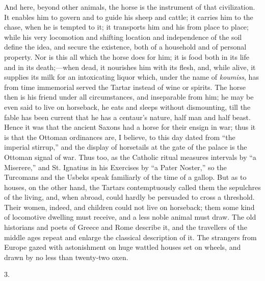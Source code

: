 And here, beyond other
animals, the horse is the instrument of that civilization. It enables
him to govern and to guide his sheep and cattle; it carries him to the
chase, when he is tempted to it; it transports him and his from place
to place; while his very locomotion and shifting location and
independence of the soil define the idea, and secure the existence,
both of a household and of personal property. Nor is this all which
the horse does for him; it is food both in its life and in its
death;—when dead, it nourishes him with its flesh, and, while alive,
it supplies its milk for an intoxicating liquor which, under the name
of \emph{koumiss}, has from time immemorial served the Tartar instead
of wine or spirits. The horse then is his friend under all
circumstances, and inseparable from him; he may be even said to live
on horseback, he eats and sleeps without dismounting, till the fable
has been current that he has a centaur's nature, half man and half
beast. Hence it was that the ancient Saxons had a horse for their
ensign in war; thus it is that the Ottoman ordinances are, I believe,
to this day dated from ``the imperial stirrup,'' and the display of
horsetails at the gate of the palace is the Ottoman signal of war.
Thus too, as the Catholic ritual measures intervals by ``a Miserere,''
and St. Ignatius in his Exercises by ``a Pater Noster,'' so the
Turcomans and the Usbeks speak familiarly of the time of a gallop. But
as to houses, on the other hand, the Tartars contemptuously called
them the sepulchres of the living, and, when abroad, could hardly be
persuaded to cross a threshold. Their women, indeed, and children
could not live on horseback; them some kind of locomotive dwelling
must receive, and a less noble animal must draw. The old historians
and poets of Greece and Rome describe it, and the travellers of the
middle ages repeat and enlarge the classical description of it. The
strangers from Europe gazed with astonishment on huge wattled houses
set on wheels, and drawn by no less than twenty-two oxen.

3.

